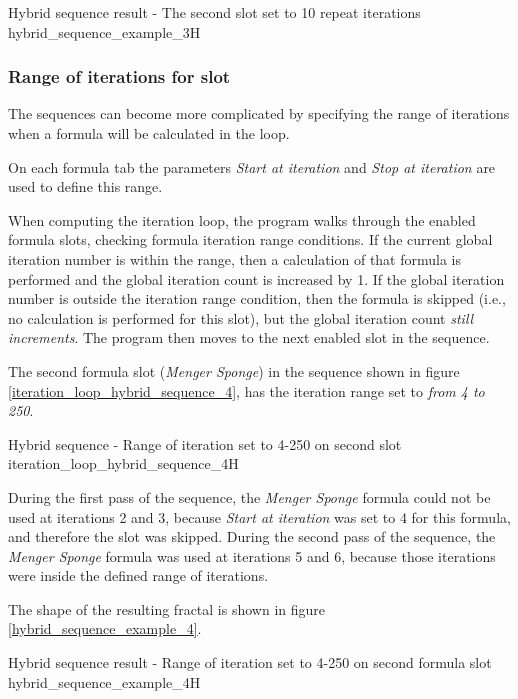 {Hybrid sequence result - The second slot set to 10 repeat iterations}
{hybrid_sequence_example_3}{H}

\subsubsection{Range of iterations for slot}

The sequences can become more complicated by specifying the range of iterations when a formula will be calculated in the loop.

On each formula tab the parameters \emph{Start at iteration} and \emph{Stop at iteration} are used to define this range.

When computing the iteration loop, the program walks through the enabled formula slots, checking formula iteration range conditions. If the current global iteration number is within the range, then a calculation of that formula is performed and the global iteration count is increased by 1. If the global iteration number is outside the iteration range condition, then the formula is skipped (i.e., no calculation is performed for this slot), but the global iteration count \emph{still increments}. The program then moves to the next enabled slot in the sequence.

The second formula slot (\emph{Menger Sponge}) in the sequence shown in figure \ref{iteration_loop_hybrid_sequence_4}, has the iteration range set to \emph{from 4 to 250}.


{Hybrid sequence - Range of iteration set to 4-250 on second slot}
{iteration_loop_hybrid_sequence_4}{H}

During the first pass of the sequence, the \emph{Menger Sponge} formula could not be used at iterations 2 and 3,
because \emph{Start at iteration} was set to 4 for this formula, and therefore the slot was skipped. During the second pass of the sequence, the \emph{Menger Sponge} formula was used at iterations 5 and 6,
because those iterations were inside the defined range of iterations.

The shape of the resulting fractal is shown in figure \ref{hybrid_sequence_example_4}.

{Hybrid sequence result - Range of iteration set to 4-250 on second formula slot}
{hybrid_sequence_example_4}{H}


